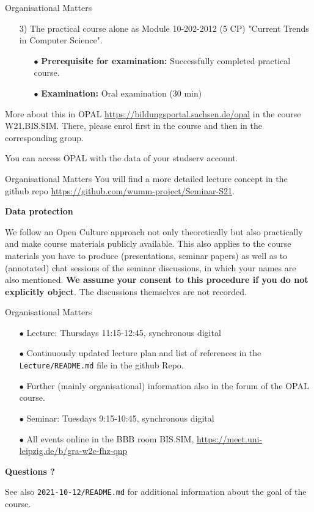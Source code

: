 \documentclass{beamer}
\newcommand{\ueberschrift}[1]{\begin{center}\bf #1\end{center}}
\begin{document}
\begin{frame}{Organisational Matters}
\begin{itemize}
\item[3)] The practical course alone as Module 10-202-2012 (5 CP) "Current
  Trends in Computer Science".
  \begin{itemize}[noitemsep]
  \item[$\bullet$] \textbf{Prerequisite for examination:} Successfully
    completed practical course.
  \item[$\bullet$] \textbf{Examination:} Oral examination (30 min)
  \end{itemize}
\end{itemize}
More about this in OPAL \url{https://bildungsportal.sachsen.de/opal} in the
course W21.BIS.SIM.  There, please enrol first in the course and then in the
corresponding group.

You can access OPAL with the data of your studserv account.

\end{frame}

\begin{frame}{Organisational Matters}
You will find a more detailed lecture concept in the github repo
\url{https://github.com/wumm-project/Seminar-S21}.

\ueberschrift{Data protection}

We follow an Open Culture approach not only theoretically but also practically
and make course materials publicly available. This also applies to the course
materials you have to produce (presentations, seminar papers) as well as to
(annotated) chat sessions of the seminar discussions, in which your names are
also mentioned. \textbf{We assume your consent to this procedure if you do not
  explicitly object}. The discussions themselves are not recorded.

\end{frame}

\begin{frame}{Organisational Matters}

\begin{itemize}
\item[$\bullet$] Lecture: Thursdays 11:15-12:45, synchronous digital
\item[$\bullet$] Continuously updated lecture plan and list of references in
  the \texttt{Lecture/README.md} file in the github Repo.  
\item[$\bullet$] Further (mainly organisational) information also in the forum
  of the OPAL course.
\item[$\bullet$] Seminar: Tuesdays 9:15-10:45, synchronous digital
\item[$\bullet$] All events online in the BBB room BIS.SIM,
  \url{https://meet.uni-leipzig.de/b/gra-w2c-fhz-qnp}
\end{itemize}
\begin{center}\LARGE\bf
  Questions ?
\end{center}

See also \texttt{2021-10-12/README.md} for additional information about the
goal of the course. 

\end{frame}
\end{document}
